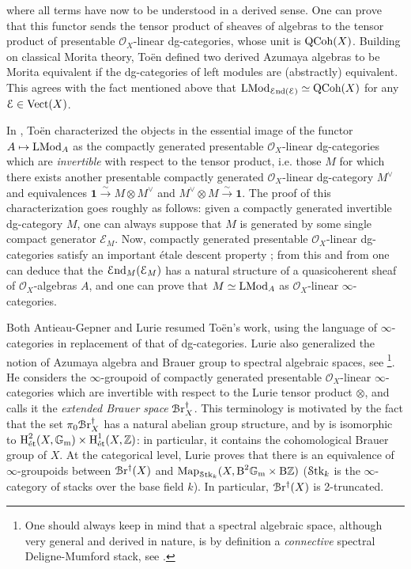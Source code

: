 \documentclass[11pt, twoside]{article} %
\numberwithin{equation}{section}
\theoremstyle{plain}
\theoremstyle{definition}
\newcommand{\B}{\textup{B}}
\newcommand{\Z}{\mathbb Z}
\newcommand{\Map}{\textup{Map}}
\newcommand{\Gm}{\mathbb G_{\mathrm{m}}}
\newcommand{\QCoh}{\textup{QCoh}}
\newcommand{\LMod}{\textup{LMod}}
\newcommand{\tH}{\textup{H}}
\newcommand{\Vect}{\textup{Vect}}
\newcommand{\cE}{\mathcal{E}}
\newcommand{\cO}{{\mathcal O}}
\newcommand{\cEnd}{{\mathcal{E}\textup{nd}}}
\newcommand{\cBre}{\mathcal{B}\textup{r}^\dagger}
\newcommand{\ett}{{\textup{\'et}}}
\newcommand{\Stk}{{\mathcal S\textup{tk}}}
\begin{document}
    where all terms have now to be understood in a derived sense. One can prove that this functor sends the tensor product of sheaves of algebras to the tensor product of presentable $\cO_X$-linear dg-categories, whose unit is $\QCoh(X)$. Building on classical Morita theory, To\"en defined two derived Azumaya algebras to be Morita equivalent if the dg-categories of left modules are (abstractly) equivalent. This agrees with the fact mentioned above that $\LMod_{\cEnd(\cE)}\simeq \QCoh(X)$ for any $\cE\in \Vect(X)$.
	
	In \cite[Proposition 1.5]{Toen-Azumaya}, To\"en characterized the objects in the essential image of the functor $A\mapsto \LMod_A$ as the compactly generated presentable $\cO_X$-linear dg-categories which are \textit{invertible} with respect to the tensor product, i.e. those $M$ for which there exists another presentable compactly generated $\cO_X$-linear dg-category $M^\vee$ and equivalences $\mathbf 1\xrightarrow{\sim} M\otimes M^\vee$ and $M^\vee\otimes M\xrightarrow{\sim} \mathbf 1.$ The proof of this characterization goes roughly as follows: given a compactly generated invertible dg-category $M$, one can always suppose that $M$ is generated by some single compact generator $\cE_M$. Now, compactly generated presentable $\cO_X$-linear dg-categories satisfy an important \'etale descent property \cite[Theorem 3.7]{Toen-Azumaya}; from this and from \cite[Proposition 3.6]{Toen-Azumaya} one can deduce that the $\cEnd_M(\cE_M)$ has a natural structure of a quasicoherent sheaf of $\cO_X$-algebras $A$, and one can prove that $M\simeq \LMod_A$ as $\cO_X$-linear $\infty$-categories.
	
	
	Both Antieau-Gepner \cite{Antieau-Gepner} and Lurie \cite[Chapter 11]{SAG} resumed To\"en's work, using the language of $\infty$-categories in replacement of that of dg-categories. Lurie also generalized the notion of Azumaya algebra and Brauer group to spectral algebraic spaces, see \cite[Section 11.5.3]{SAG}\footnote{One should always keep in mind that a spectral algebraic space, although very general and derived in nature, is by definition a \textit{connective} spectral Deligne-Mumford stack, see \cite[Definition 1.6.8.1, Definition 1.4.4.2]{HA}.}. He considers the $\infty$-groupoid of compactly generated presentable $\cO_X$-linear $\infty$-categories which are invertible with respect to the Lurie tensor product $\otimes$, and calls it the \textit{extended Brauer space} $\cBre_X$. This terminology is motivated by the fact that the set $\pi_0\cBre_X$ has a natural abelian group structure, and by \cite[Corollary 2.12]{Toen-Azumaya} is isomorphic to $\tH^2_{\ett}(X,\Gm)\times \tH^1_{\ett}(X,\Z)$: in particular, it contains the cohomological Brauer group of $X$. At the categorical level, Lurie proves that there is an equivalence of $\infty$-groupoids between $\cBre(X)$ and $\Map_{\Stk_k}(X,\B^2\Gm\times \B\Z)$ ($\Stk_k$ is the $\infty$-category of stacks over the base field $k$). In particular, $\cBre(X)$ is 2-truncated.
	
\end{document}
